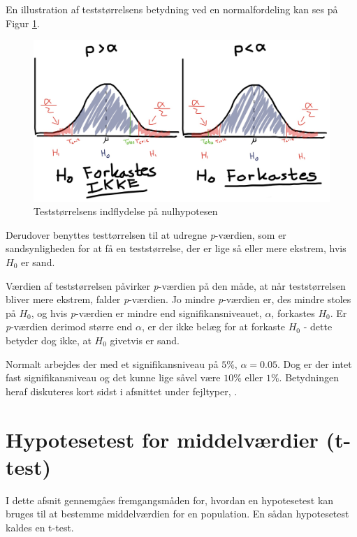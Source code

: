 \documentclass[
]{book}
\theoremstyle{definition}
\theoremstyle{definition}
\theoremstyle{definition}
\theoremstyle{remark}
\begin{document}
En illustration af teststørrelsens betydning ved en normalfordeling kan ses på Figur \ref{fig:figur-Hypotesetest}.

\begin{figure}

{\centering \includegraphics[width=0.75\linewidth]{images/HippoHyppo} 

}

\caption{Teststørrelsens indflydelse på nulhypotesen}\label{fig:figur-Hypotesetest}
\end{figure}

Derudover benyttes testtørrelsen til at udregne \emph{p}-værdien, som er sandsynligheden for at få en teststørrelse, der er lige så eller mere ekstrem, hvis \(H_0\) er sand.

Værdien af teststørrelsen påvirker \emph{p}-værdien på den måde, at når teststørrelsen bliver mere ekstrem, falder \emph{p}-værdien. Jo mindre \emph{p}-værdien er, des mindre stoles på \(H_0\), og hvis \emph{p}-værdien er mindre end signifikansniveauet, \(\alpha\), forkastes \(H_0\). Er \emph{p}-værdien derimod større end \(\alpha\), er der ikke belæg for at forkaste \(H_0\) - dette betyder dog ikke, at \(H_0\) givetvis er sand.

Normalt arbejdes der med et signifikansniveau på \(5\%\), \(\alpha=0.05\). Dog er der intet fast signifikansniveau og det kunne lige såvel være \(10\%\) eller \(1\%\). Betydningen heraf diskuteres kort sidst i afsnittet under fejltyper, \citep{ASTA-HYPO}.

\hypertarget{t-test}{%
\section{Hypotesetest for middelværdier (t-test)}\label{t-test}}

I dette afsnit gennemgåes fremgangsmåden for, hvordan en hypotesetest kan bruges til at bestemme middelværdien for en population. En sådan hypotesetest kaldes en t-test.
\end{document}
